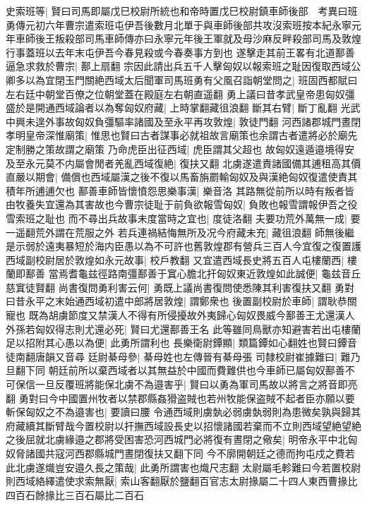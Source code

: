 史索班等|{
	賢曰司馬即屬戊巳校尉所統也和帝時置戊巳校尉鎮車師後部　考異曰班勇傳元初六年曹宗遣索班屯伊吾後數月北單于與車師後部共攻沒索班按本紀永寧元年車師後王叛殺部司馬車師傳亦曰永寧元年後王軍就及母沙麻反畔殺部司馬及敦煌行事蓋班以去年末屯伊吾今春見殺或今春奏事方到也}
遂擊走其前王畧有北道鄯善逼急求救於曹宗|{
	鄯上扇翻}
宗因此請出兵五千人擊匈奴以報索班之耻因復取西域公卿多以為宜閉玉門關絶西域太后聞軍司馬班勇有父風召詣朝堂問之|{
	班固西都賦曰左右廷中朝堂百僚之位朝堂蓋在殿庭左右朝直遥翻}
勇上議曰昔孝武皇帝患匈奴彊盛於是開通西域論者以為奪匈奴府藏|{
	上時掌翻藏徂浪翻}
斷其右臂|{
	斷丁亂翻}
光武中興未遑外事故匈奴負彊驅率諸國及至永平再攻敦煌|{
	敦徒門翻}
河西諸郡城門晝閉孝明皇帝深惟廟策|{
	惟思也賢曰古者謀事必就祖故言廟策也余謂古者遣將必於廟先定制勝之策故謂之廟策}
乃命虎臣出征西域|{
	虎臣謂其父超也}
故匈奴遠遁邉境得安及至永元莫不内屬會閒者羌亂西域復絶|{
	復扶又翻}
北虜遂遣責諸國備其逋租高其價直嚴以期會|{
	備償也西域屬漢之後不復以馬畜旃罽輸匈奴及與漢絶匈奴復遣使責其積年所逋逋欠也}
鄯善車師皆懷憤怨思樂事漢|{
	樂音洛}
其路無從前所以時有叛者皆由牧養失宜還為其害故也今曹宗徒耻于前負欲報雪匈奴|{
	負敗也報雪謂報伊吾之役雪索班之耻也}
而不尋出兵故事未度當時之宜也|{
	度徒洛翻}
夫要功荒外萬無一成|{
	要一遥翻荒外謂在荒服之外}
若兵連禍結悔無所及况今府藏未充|{
	藏徂浪翻}
師無後繼是示弱於遠夷暴短於海内臣愚以為不可許也舊敦煌郡有營兵三百人今宜復之復置護西域副校尉居於敦煌如永元故事|{
	校戶教翻}
又宜遣西域長史將五百人屯樓蘭西|{
	樓蘭即鄯善}
當焉耆龜兹徑路南彊鄯善于窴心膽北扞匈奴東近敦煌如此誠便|{
	龜兹音丘慈窴徒賢翻}
尚書復問勇利害云何|{
	勇既上議尚書復問使悉陳其利害復扶又翻}
勇對曰昔永平之末始通西域初遣中郎將居敦煌|{
	謂鄭衆也}
後置副校尉於車師|{
	謂耿恭關寵也}
既為胡虜節度又禁漢人不得有所侵擾故外夷歸心匈奴畏威今鄯善王尤還漢人外孫若匈奴得志則尤還必死|{
	賢曰尤還鄯善王名}
此等雖同鳥獸亦知避害若出屯樓蘭足以招附其心愚以為便|{
	此勇所謂利也}
長樂衛尉鐔顯|{
	類篇鐔如心翻姓也賢曰鐔音徒南翻唐韻又音尋}
廷尉綦母參|{
	綦母姓也左傳晉有綦母張}
司隸校尉崔據難曰|{
	難乃旦翻下同}
朝廷前所以棄西域者以其無益於中國而費難供也今車師已屬匈奴鄯善不可保信一旦反覆班將能保北虜不為邉害乎|{
	賢曰以勇為軍司馬故以將言之將音即亮翻}
勇對曰今中國置州牧者以禁郡縣姦猾盗賊也若州牧能保盗賊不起者臣亦願以要斬保匈奴之不為邉害也|{
	要讀曰腰}
令通西域則虜埶必弱虜埶弱則為患微矣孰與歸其府藏續其斷臂哉今置校尉以扞撫西域設長史以招懷諸國若棄而不立則西域望絶望絶之後屈就北虜緣邉之郡將受困害恐河西城門必將復有晝閉之儆矣|{
	明帝永平中北匈奴脅諸國共寇河西郡縣城門晝閉復扶又翻下同}
今不廓開朝廷之德而拘屯戍之費若此北虜遂熾豈安邉久長之策哉|{
	此勇所謂害也熾尺志翻}
太尉屬毛軫難曰今若置校尉則西域絡繹遣使求索無厭|{
	索山客翻厭於鹽翻百官志太尉掾屬二十四人東西曹掾比四百石餘掾比三百石屬比二百石}
